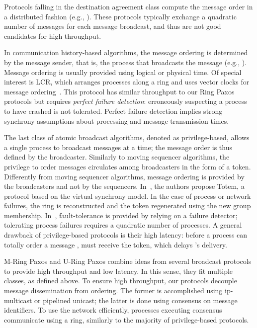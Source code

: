 \documentclass[final,3p,times,twocolumn,authoryear]{elsarticle}
\begin{document}
Protocols falling in the destination agreement class compute the message order in a distributed fashion (e.g., \cite{CT96,FIMR98}). These protocols typically exchange a quadratic number of messages for each message broadcast, and thus are not good candidates for high throughput.

In communication history-based algorithms, the message ordering is determined by the message sender, that is, the process that broadcasts the message (e.g., \cite{Lam78b,Ng91}). Message ordering is usually provided using logical or physical time. Of special interest is LCR, which arranges processes along a ring and uses vector clocks for message ordering~\cite{Guerraoui2010}. This protocol has similar throughput to our Ring Paxos protocols but requires \emph{perfect failure detection}: erroneously suspecting a process to have crashed is not tolerated. Perfect failure detection implies strong synchrony assumptions about processing and message transmission times.

The last class of atomic broadcast algorithms, denoted as privilege-based, allows a single process to broadcast messages at a
time; the message order is thus defined by the broadcaster. Similarly to moving sequencer algorithms, the privilege to order messages circulates among broadcasters in the form of a token. Differently from moving sequencer algorithms, message ordering is provided by the broadcasters and not by the sequencers. In~\cite{amir1995totem}, the authors propose Totem, a protocol based on the virtual synchrony model.  In the case of process or network failures, the ring is reconstructed and the token regenerated using the new group membership. In~\cite{ESU04}, fault-tolerance is provided by relying on a failure detector; tolerating  process failures requires a quadratic number of processes. A general drawback of privilege-based protocols is their high latency: before a process  can totally order a message ,  must receive the token, which delays 's delivery.

M-Ring Paxos and U-Ring Paxos combine ideas from several broadcast protocols to provide high throughput and low latency. In this sense, they fit multiple classes, as defined above. To ensure high throughput, our protocols decouple message dissemination from ordering. The former is accomplished using ip-multicast or pipelined unicast; the latter is done using consensus on
message identifiers. To use the network efficiently, processes executing consensus communicate using a ring, similarly to the majority of privilege-based protocols. 
\end{document}

